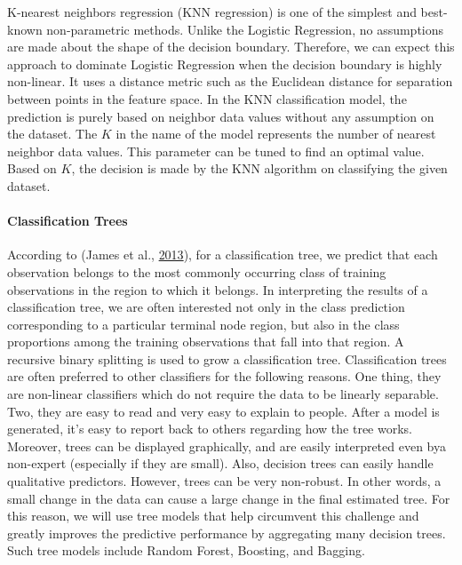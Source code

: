 \documentclass[
  10pt,
]{article}
\begin{document}
K-nearest neighbors regression (KNN regression) is one of the simplest and best-known
non-parametric methods. Unlike the Logistic Regression, no assumptions are made about the shape of the decision boundary. Therefore, we can expect this approach to dominate Logistic Regression when the decision boundary is highly non-linear. It uses a distance metric such as the Euclidean distance for separation between points in the feature space. In the KNN classification model, the prediction is purely based on neighbor data values without any assumption on the dataset. The \(K\) in the name of the model represents the number of nearest neighbor data values. This parameter can be tuned to find an optimal value. Based on \(K\), the decision is made by the KNN algorithm on classifying the given dataset.

\hypertarget{classification-trees}{%
\paragraph{Classification Trees}\label{classification-trees}}

According to (James et al., \protect\hyperlink{ref-james2013introduction}{2013}), for a classification tree, we predict that each observation belongs to the most commonly occurring class of training observations in the region to which it belongs. In interpreting the results of a classification tree, we are often interested not only in the class prediction corresponding to a particular terminal node region, but also in the class proportions among the training observations that fall into that region. A recursive binary splitting is used to grow a classification tree. Classification trees are often preferred to other classifiers for the following reasons. One thing, they are non-linear classifiers which do not require the data to be linearly separable. Two, they are easy to read and very easy to explain to people. After a model is generated, it's easy to report back to others regarding how the tree works. Moreover, trees can be displayed graphically, and are easily interpreted even bya non-expert (especially if they are small). Also, decision trees can easily handle qualitative predictors. However, trees can be very non-robust. In other words, a small change in the data can cause a large change in the final estimated tree. For this reason, we will use tree models that help circumvent this challenge and greatly improves the predictive performance by aggregating many decision trees. Such tree models include Random Forest, Boosting, and Bagging.
\end{document}
